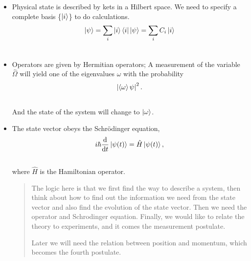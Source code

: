 \documentclass[letterpaper,10pt,english]{sphinxmanual}
\def\d{{\rm d}}
\begin{document}
\label{QuantumMechanics:first-three-postulates}\begin{itemize}
\item {} 
Physical state is described by kets in a Hilbert space. We need to specify a complete basis \{$\ket{i}$\} to do calculations.
\begin{gather}
\begin{split}\ket{\psi} = \sum_i \ket{i}\bra{i}\ket{\psi} = \sum_i C_i \ket{i}\end{split}\notag\\\begin{split}\end{split}\notag
\end{gather}
\item {} 
Operators are given by Hermitian operators; A measurement of the variable $\hat \Omega$ will yield one of the eigenvalues $\omega$ with the probability
\begin{gather}
\begin{split}\left|\braket{\omega}{\psi}\right|^2 .\end{split}\notag\\\begin{split}\end{split}\notag
\end{gather}
And the state of the system will change to $\ket{\omega}$.

\item {} 
The state vector obeys the Schrödinger equation,
\begin{gather}
\begin{split}i\hbar \frac{\d}{\d t}\ket{\psi(t)} = \hat H \ket{\psi(t)} ,\end{split}\notag\\\begin{split}\end{split}\notag
\end{gather}
where $\hat H$ is the Hamiltonian operator.
\begin{quote}

The logic here is that we first find the way to describe a system, then think about how to find out the information we need from the state vector and also find the evolution of the state vector. Then we need the operator and Schrodinger equation. Finally, we would like to relate the theory to experiments, and it comes the measurement postulate.

Later we will need the relation between position and momentum, which becomes the fourth postulate.
\end{quote}


\end{itemize}
\end{document}
